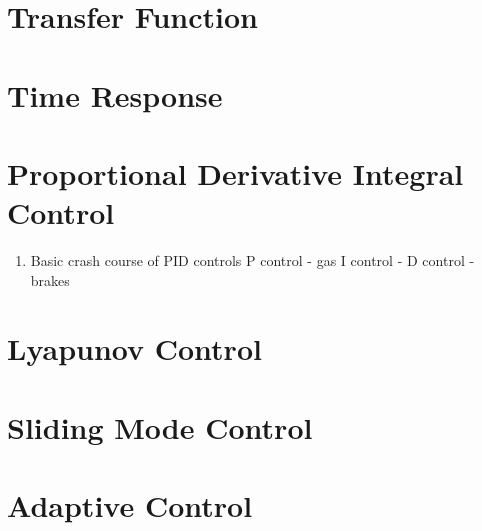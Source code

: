 \documentclass{article}
\begin{document}
\section{Transfer Function}

\section{Time Response}

\section{Proportional Derivative Integral Control}

\begin{enumerate}[itemsep=-5pt]
\item Basic crash course of PID controls
P control - gas
I control - 
D control - brakes
\end{enumerate}

\section{Lyapunov Control}

\section{Sliding Mode Control}

\section{Adaptive Control}
\end{document}

